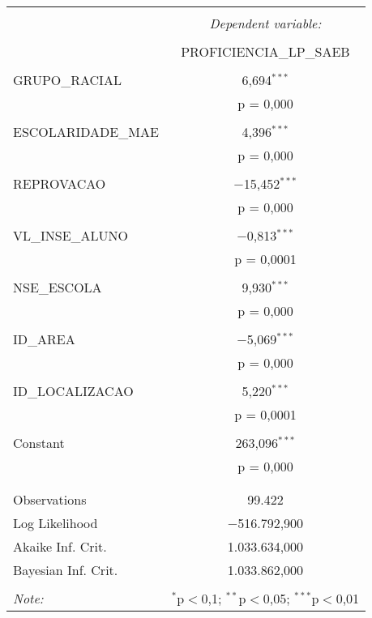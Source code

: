 \begin{table}[!htbp] \centering 
  \caption{} 
  \label{} 
\begin{tabular}{@{\extracolsep{5pt}}lc} 
\\[-1.8ex]\hline 
\hline \\[-1.8ex] 
 & \multicolumn{1}{c}{\textit{Dependent variable:}} \\ 
\cline{2-2} 
\\[-1.8ex] & PROFICIENCIA\_LP\_SAEB \\ 
\hline \\[-1.8ex] 
 GRUPO\_RACIAL & 6,694$^{***}$ \\ 
  & p = 0,000 \\ 
  & \\ 
 ESCOLARIDADE\_MAE & 4,396$^{***}$ \\ 
  & p = 0,000 \\ 
  & \\ 
 REPROVACAO & $-$15,452$^{***}$ \\ 
  & p = 0,000 \\ 
  & \\ 
 VL\_INSE\_ALUNO & $-$0,813$^{***}$ \\ 
  & p = 0,0001 \\ 
  & \\ 
 NSE\_ESCOLA & 9,930$^{***}$ \\ 
  & p = 0,000 \\ 
  & \\ 
 ID\_AREA & $-$5,069$^{***}$ \\ 
  & p = 0,000 \\ 
  & \\ 
 ID\_LOCALIZACAO & 5,220$^{***}$ \\ 
  & p = 0,0001 \\ 
  & \\ 
 Constant & 263,096$^{***}$ \\ 
  & p = 0,000 \\ 
  & \\ 
\hline \\[-1.8ex] 
Observations & 99.422 \\ 
Log Likelihood & $-$516.792,900 \\ 
Akaike Inf. Crit. & 1.033.634,000 \\ 
Bayesian Inf. Crit. & 1.033.862,000 \\ 
\hline 
\hline \\[-1.8ex] 
\textit{Note:}  & \multicolumn{1}{r}{$^{*}$p$<$0,1; $^{**}$p$<$0,05; $^{***}$p$<$0,01} \\ 
\end{tabular} 
\end{table} 

